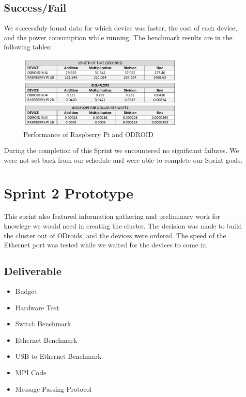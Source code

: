\subsection{Success/Fail}

We successfuly found data for which device was faster, the cost of each device, and the power consumption while running. The benchmark results are in the following tables: \\

\begin{figure}[tbh]
	\caption{Performance of Raspberry Pi and ODROID}
	\centering
		\includegraphics[width=0.75\textwidth]{pivsxu4table2.JPG}
\end{figure}

During the completion of this Sprint we encountered no significant failures. We were not set back from our schedule and were able to complete our Sprint goals.

\section{Sprint 2 Prototype}

This sprint also featured information gathering and preliminary work for knowlege we would need in creating the cluster. The decision was made to build the cluster out of ODroids, and the devices were ordered. The speed of the Ethernet port was tested while we waited for the devices to come in.

\subsection{Deliverable}

\begin{itemize}
\item Budget
\item Hardware Test
\item Switch Benchmark
\item Ethernet Benchmark
\item USB to Ethernet Benchmark
\item MPI Code
\item Message-Passing Protocol
\end{itemize}

